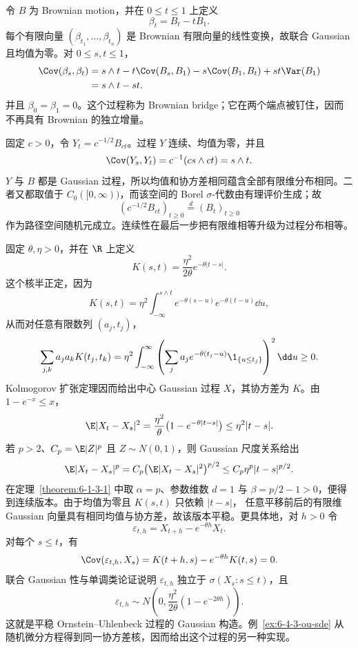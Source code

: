 \begin{example}\label{ex:6-4-1-2}
令 $B$ 为 Brownian motion，并在 $0\le t\le1$ 上定义
\[
 \beta_t=B_t-tB_1.
\]
每个有限向量 $(\beta_{t_1},\ldots,\beta_{t_n})$ 是 Brownian 有限向量的线性变换，故联合
Gaussian 且均值为零。对 $0\le s,t\le1$，
\begin{align*}
 \Cov(\beta_s,\beta_t)
 &=s\wedge t-t\Cov(B_s,B_1)-s\Cov(B_1,B_t)+st\Var(B_1)\\
 &=s\wedge t-st.
\end{align*}
并且 $\beta_0=\beta_1=0$。这个过程称为 Brownian bridge；它在两个端点被钉住，因而不再具有
Brownian 的独立增量。
\end{example}

\begin{example}[Brownian 缩放]\label{ex:6-4-1-3}
固定 $c>0$，令 $Y_t=c^{-1/2}B_{ct}$。过程 $Y$ 连续、均值为零，并且
\[
 \Cov(Y_s,Y_t)=c^{-1}(cs\wedge ct)=s\wedge t.
\]
$Y$ 与 $B$ 都是 Gaussian 过程，所以均值和协方差相同蕴含全部有限维分布相同。二者又都取值于
$C_0([0,\infty))$，而该空间的 Borel $\sigma$-代数由有理评价生成；故
\[
 (c^{-1/2}B_{ct})_{t\ge0}\overset d=(B_t)_{t\ge0}
\]
作为路径空间随机元成立。连续性在最后一步把有限维相等升级为过程分布相等。
\end{example}

\begin{example}
\label{ex:6-4-1-ou-gaussian}
固定 $\theta,\eta>0$，并在 $\R$ 上定义
\[
 K(s,t)=\frac{\eta^2}{2\theta}e^{-\theta|t-s|}.
\]
这个核半正定，因为
\[
 K(s,t)=\eta^2\int_{-\infty}^{s\wedge t}
 e^{-\theta(s-u)}e^{-\theta(t-u)}\dd u,
\]
从而对任意有限数列 $(a_j,t_j)$，
\[
 \sum_{j,k}a_ja_kK(t_j,t_k)
 =\eta^2\int_{-\infty}^{\infty}
 \left(\sum_j a_je^{-\theta(t_j-u)}\1_{\{u\le t_j\}}\right)^2\dd u\ge0.
\]
Kolmogorov 扩张定理因而给出中心 Gaussian 过程 $X$，其协方差为 $K$。由
$1-e^{-x}\le x$，
\[
 \E|X_t-X_s|^2
 =\frac{\eta^2}{\theta}\bigl(1-e^{-\theta|t-s|}\bigr)
 \le \eta^2|t-s|.
\]
若 $p>2$、$C_p=\E|Z|^p$ 且 $Z\sim N(0,1)$，则 Gaussian 尺度关系给出
\[
 \E|X_t-X_s|^p
 =C_p\bigl(\E|X_t-X_s|^2\bigr)^{p/2}
 \le C_p\eta^p|t-s|^{p/2}.
\]
在定理~\ref{theorem:6-1-3-1} 中取 $\alpha=p$、参数维数 $d=1$ 与
$\beta=p/2-1>0$，便得到连续版本。由于均值为零且 $K(s,t)$ 只依赖 $|t-s|$，
任意平移前后的有限维 Gaussian 向量具有相同均值与协方差，故该版本平稳。更具体地，对 $h>0$ 令
\[
 \varepsilon_{t,h}=X_{t+h}-e^{-\theta h}X_t.
\]
对每个 $s\le t$，有
\[
 \Cov(\varepsilon_{t,h},X_s)
 =K(t+h,s)-e^{-\theta h}K(t,s)=0.
\]
联合 Gaussian 性与单调类论证说明 $\varepsilon_{t,h}$ 独立于
$\sigma(X_s:s\le t)$，且
\[
 \varepsilon_{t,h}\sim
 N\!\left(0,\frac{\eta^2}{2\theta}(1-e^{-2\theta h})\right).
\]
这就是平稳 Ornstein--Uhlenbeck 过程的 Gaussian 构造。例~\ref{ex:6-4-3-ou-sde}
从随机微分方程得到同一协方差核，因而给出这个过程的另一种实现。
\end{example}

